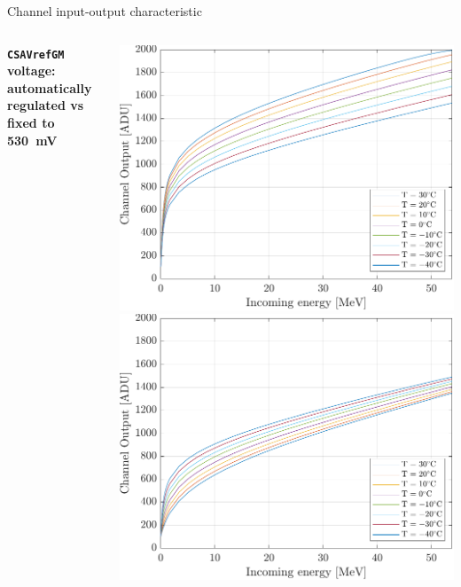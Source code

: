 \documentclass[aspectratio=169,xcolor=dvipsnames,handout]{beamer} %
\begin{document}
\begin{frame}{Channel input-output characteristic}
\begin{columns}
            \addtolength{\leftmargini}{\labelsep}
            \vskip0.3cm
            \textbf{\texttt{CSAVrefGM} voltage: automatically regulated vs fixed to \SI{530}{\milli\volt}}\\
    
            \vskip-0.4cm
            \begin{center}
                \includegraphics[height=0.37\textheight]{images/temperature_effects/fdt_csavrefgm_auto_tau6_keV_0011.pdf}
                \includegraphics[height=0.37\textheight]{images/temperature_effects/fdt_csavrefgm_530mV_tau6_keV.pdf}
            \end{center}
    

\end{columns}
\end{frame}
\end{document}
